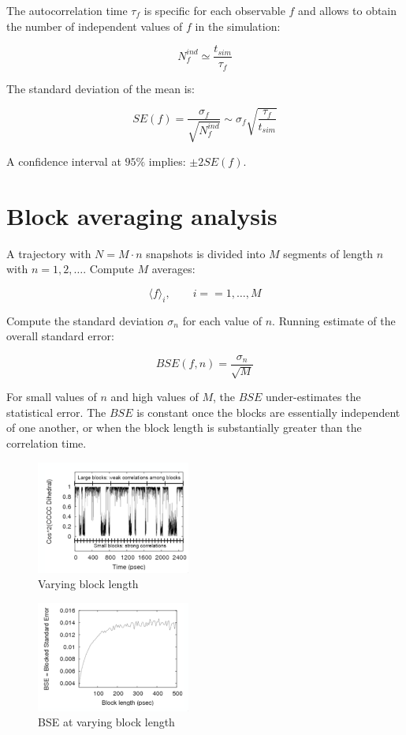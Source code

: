 	The autocorrelation time $\tau_f$ is specific for each observable $f$ and allows to obtain the number of independent values of $f$ in the simulation:

	$$N_f^{ind}\simeq\frac{t_{sim}}{\tau_f}$$

	The standard deviation of the mean is:

	$$SE(f) = \frac{\sigma_f}{\sqrt{N_f^{ind}}}\sim\sigma_f\sqrt{\frac{\tau_f}{t_{sim}}}$$

	A confidence interval at $95\%$ implies: $\pm 2 SE(f)$.

\section{Block averaging analysis}
A trajectory with $N = M\cdot n$ snapshots is divided into $M$ segments of length $n$ with $n =1, 2, \dots$.
Compute $M$ averages:

$$\langle f\rangle_i, \qquad i = =1, \dots, M$$

Compute the standard deviation $\sigma_n$ for each value of $n$.
Running estimate of the overall standard error:

$$BSE(f, n) = \frac{\sigma_n}{\sqrt{M}}$$

For small values of $n$ and high values of $M$, the $BSE$ under-estimates the statistical error.
The $BSE$ is constant once the blocks are essentially independent of one another, or when the block length is substantially greater than the correlation time.


\begin{multicols}{2}

	\begin{figure}[H]
		\includegraphics[width = 0.45\textwidth]{block-length}
		\caption{Varying block length}
		\label{fig:block-length}
	\end{figure}

	\columnbreak

	\begin{figure}[H]
		\includegraphics[width = 0.45\textwidth]{bse}
		\caption{BSE at varying block length}
		\label{fig:bse}
	\end{figure}

\end{multicols}
